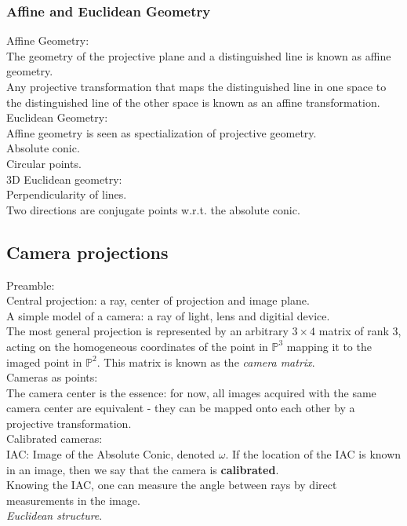 \documentclass[12pt]{article}
\begin{document}
\subsubsection{Affine and Euclidean Geometry}
Affine Geometry: \\
The geometry of the projective plane and a distinguished line is known as affine geometry. \\
Any projective transformation that maps the distinguished line in one space to the
distinguished line of the other space is known as an affine transformation. \\

\noindent Euclidean Geometry: \\
Affine geometry is seen as spectialization of projective geometry. \\
Absolute conic. \\
Circular points. \\

\noindent 3D Euclidean geometry: \\
Perpendicularity of lines. \\
Two directions are conjugate points w.r.t. the absolute conic.

\subsection{Camera projections}
Preamble: \\
Central projection: a ray, center of projection and image plane. \\
A simple model of a camera: a ray of light, lens and digitial device. \\
The most general projection is represented by an arbitrary $ 3\times4 $ matrix
of rank 3, acting on the homogeneous coordinates of the point in $ \mathbb{P}^3 $
mapping it to the imaged point in $ \mathbb{P}^2 $. This matrix is known as the \textit{camera matrix}. \\

\noindent Cameras as points: \\
The camera center is the essence: for now, all images acquired with the same camera center are equivalent -
they can be mapped onto each other by a projective transformation. \\

\noindent Calibrated cameras: \\
IAC: Image of the Absolute Conic, denoted $\omega$. If the location of the IAC is known in an image, then we say that the 
camera is \textbf{calibrated}. \\
Knowing the IAC, one can measure the angle between rays by direct measurements in the image. \\
\textit{Euclidean structure}. \\
\end{document}
